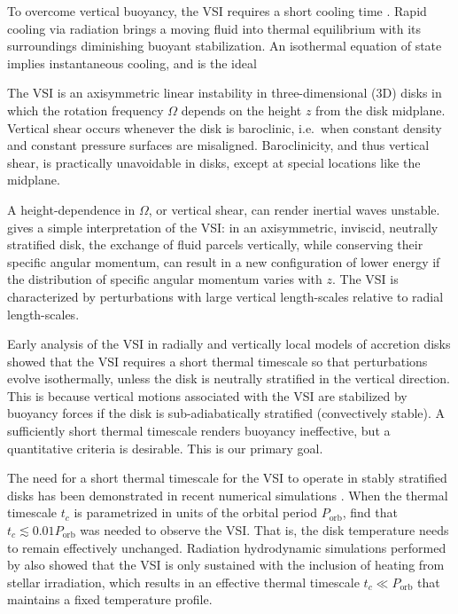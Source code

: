 \documentclass[iop]{emulateapj}
\begin{document}
To overcome vertical buoyancy, the VSI requires a short cooling time \citep{goldreich67, nelson13}.  Rapid cooling via radiation
brings a moving fluid into thermal equilibrium with its surroundings diminishing buoyant stabilization.  An isothermal equation
of state implies instantaneous cooling, and is the ideal   


The VSI is an axisymmetric linear instability 
in three-dimensional (3D) disks in which the rotation frequency
$\Omega$ depends on the height $z$ from the disk midplane. 
Vertical shear occurs whenever the disk is baroclinic, i.e.\ when constant 
density and constant pressure surfaces are misaligned.  Baroclinicity, and thus vertical shear, is 
practically unavoidable in disks, except at special locations like the midplane.

A height-dependence in $\Omega$, or vertical shear, can render
inertial waves unstable. \cite{barker15} gives a simple 
interpretation of the VSI: in an axisymmetric, inviscid, neutrally
stratified disk, the exchange of fluid parcels vertically, while
conserving their specific angular momentum, can result in a new
configuration of lower energy if the distribution of specific angular
momentum varies with $z$. The VSI is characterized by perturbations
with large vertical length-scales  relative to radial length-scales.   

Early analysis of the VSI in radially and vertically local 
models of accretion disks \citep{urpin98,urpin03} showed that the VSI
requires a short thermal timescale so that perturbations evolve 
isothermally, unless the disk is neutrally stratified in the vertical
direction. This is because
vertical motions associated with the VSI 
are stabilized by buoyancy forces if the disk is sub-adiabatically
stratified (convectively stable). A sufficiently short thermal
timescale renders buoyancy ineffective, but a quantitative criteria is
desirable. This is our primary goal.  

The need for a short thermal timescale for the VSI to operate in
stably stratified disks has been demonstrated in recent numerical simulations 
\citep{nelson13,stoll14}. When the  thermal timescale $t_c$ is
parametrized in units of the orbital period  $P_\mathrm{orb}$,
\cite{nelson13} find that $t_c\lesssim  0.01P_\mathrm{orb}$ was needed
to observe the VSI. That is, the  disk temperature needs to remain
effectively unchanged. Radiation hydrodynamic simulations performed by
\cite{stoll14} also showed that the VSI is only sustained with the
inclusion of heating from stellar irradiation, which results in an
effective thermal timescale $t_c\ll P_\mathrm{orb}$ that maintains a
fixed temperature profile.     
\end{document}
